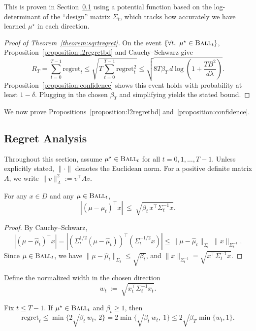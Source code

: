 This is proven in Section~\ref{sec:regret} using a potential function based on
the log-determinant of the ``design'' matrix $\Sigma_t$, which tracks how
accurately we have learned $\mu^\star$ in each direction.

\begin{proof}[Proof of Theorem~\ref{theorem:sqrtregret}]
On the event $\{\forall t,\ \mu^\star\in \textsc{Ball}_t\}$, Proposition~\ref{proposition:l2regretbd}
and Cauchy--Schwarz give
\[
R_T
=\sum_{t=0}^{T-1}\mathrm{regret}_t
\le \sqrt{T\sum_{t=0}^{T-1}\mathrm{regret}_t^2}
\le \sqrt{8T\beta_T\, d \log\!\left(1+\frac{TB^2}{d\lambda}\right)}.
\]
Proposition~\ref{proposition:confidence} shows this event holds with probability
at least $1-\delta$.  Plugging in the chosen $\beta_T$ and simplifying yields the stated bound.
\end{proof}

We now prove Propositions~\ref{proposition:l2regretbd} and~\ref{proposition:confidence}.

\subsection{Regret Analysis}\label{sec:regret}

Throughout this section, assume $\mu^\star\in\textsc{Ball}_t$ for all
$t=0,1,\dots,T-1$.  Unless explicitly stated, $\|\cdot\|$ denotes the Euclidean norm.
For a positive definite matrix $A$, we write $\|v\|_A^2 := v^\top A v$.

\begin{lemma}\label{lemma:width}
For any $x\in D$ and any $\mu\in\textsc{Ball}_t$,
\[
|(\mu-\widehat{\mu}_t)^\top x|
\ \le\
\sqrt{\beta_t\, x^\top \Sigma_t^{-1}x}.
\]
\end{lemma}

\begin{proof}
By Cauchy--Schwarz,
\[
|(\mu-\widehat{\mu}_t)^\top x|
=
|(\Sigma_t^{1/2}(\mu-\widehat{\mu}_t))^\top (\Sigma_t^{-1/2}x)|
\le
\|\mu-\widehat{\mu}_t\|_{\Sigma_t}\ \|x\|_{\Sigma_t^{-1}}.
\]
Since $\mu\in\textsc{Ball}_t$, we have $\|\mu-\widehat{\mu}_t\|_{\Sigma_t}\le \sqrt{\beta_t}$,
and $\|x\|_{\Sigma_t^{-1}}=\sqrt{x^\top \Sigma_t^{-1}x}$.
\end{proof}

Define the normalized width in the chosen direction
\[
w_t \ :=\ \sqrt{x_t^\top \Sigma_t^{-1}x_t}.
\]

\begin{lemma}\label{lem:regretvswidth}
Fix $t\le T-1$. If $\mu^\star\in\textsc{Ball}_t$ and $\beta_t\ge 1$, then
\[
\mathrm{regret}_t
\le
\min\!\big\{2\sqrt{\beta_t}\, w_t,\ 2\big\}
=
2\min\!\big\{\sqrt{\beta_t}\, w_t,\ 1\big\}
\le
2\sqrt{\beta_T}\min\!\{w_t,1\}.
\]
\end{lemma}

